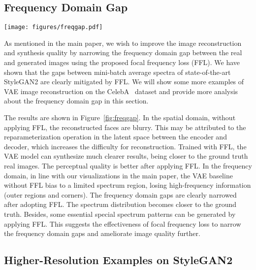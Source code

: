 \documentclass[10pt,twocolumn,letterpaper]{article}
\begin{document}
\subsection{Frequency Domain Gap}
\label{sec:freqgap}


\begin{figure*}[t]
	\centering
\texttt{[image: figures/freqgap.pdf]}
\caption{Frequency domain gaps are narrowed by the focal frequency loss (FFL) for VAE image reconstruction on CelebA.}
	\label{fig:freqgap}
	\vspace{-0.2cm}
\end{figure*}


As mentioned in the main paper, we wish to improve the image reconstruction and synthesis quality by narrowing the frequency domain gap between the real and generated images using the proposed focal frequency loss (FFL).
We have shown that the gaps between mini-batch average spectra of state-of-the-art StyleGAN2 are clearly mitigated by FFL.
We will show some more examples of VAE image reconstruction on the CelebA~\cite{celeba} dataset and provide more analysis about the frequency domain gap in this section.

The results are shown in Figure~\ref{fig:freqgap}.
In the spatial domain, without applying FFL, the reconstructed faces are blurry. This may be attributed to the reparameterization operation in the latent space between the encoder and decoder, which increases the difficulty for reconstruction.
Trained with FFL, the VAE model can synthesize much clearer results, being closer to the ground truth real images. The perceptual quality is better after applying FFL.
In the frequency domain, in line with our visualizations in the main paper, the VAE baseline without FFL bias to a limited spectrum region, losing high-frequency information (outer regions and corners).
The frequency domain gaps are clearly narrowed after adopting FFL. The spectrum distribution becomes closer to the ground truth. Besides, some essential special spectrum patterns can be generated by applying FFL.
This suggests the effectiveness of focal frequency loss to narrow the frequency domain gaps and ameliorate image quality further.



\subsection{Higher-Resolution Examples on StyleGAN2}
\label{sec:moreexamples}
\end{document}
